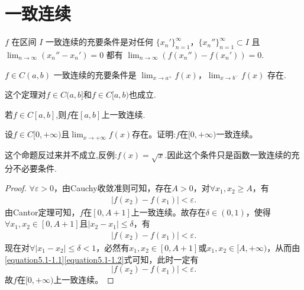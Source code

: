 \documentclass[../../main.tex]{subfiles}
\begin{document}
\section{一致连续}

\begin{theorem}\label{theorem:一致连续的充要条件1}
\(f\) 在区间 \(I\) 一致连续的充要条件是对任何 \(\{x_n'\}_{n = 1}^{\infty}\)，\(\{x_n''\}_{n = 1}^{\infty}\subset I\) 且 \(\lim_{n\rightarrow\infty}(x_n'' - x_n') = 0\) 都有 \(\lim_{n\rightarrow\infty}(f(x_n'') - f(x_n'))=0\).
\end{theorem}

\begin{theorem}[Cantor定理]\label{theorem:Cantor定理}
\(f\in C(a,b)\) 一致连续的充要条件是 \(\lim_{x\rightarrow a^{+}}f(x)\)，\(\lim_{x\rightarrow b^{-}}f(x)\) 存在.
\end{theorem}
\begin{remark}
这个定理对$f\in C(a,b]$和$f\in C[a,b)$也成立.
\end{remark}

\begin{corollary}\label{corollary:闭区间上的连续函数一定一致连续.}
若$f\in C[a,b]$,则$f$在$[a,b]$上一致连续.
\end{corollary}

\begin{proposition}\label{proposition一致连续的充分不必要条件}
设\(f\in C[0,+\infty)\)且\(\lim_{x\rightarrow +\infty}f(x)\)存在。证明:\(f\)在\([0,+\infty)\)一致连续。
\end{proposition}
\begin{remark}
这个命题反过来并不成立,反例:$f(x)=\sqrt{x}$.因此这个条件只是函数一致连续的充分不必要条件.
\end{remark}
\begin{proof}
\(\forall \varepsilon > 0\)，由Cauchy收敛准则可知，存在\(A > 0\)，对\(\forall x_1, x_2 \geqslant A\)，有
\begin{align}
\left| f(x_2) - f(x_1) \right| < \varepsilon.  \label{equation5.1-1.1}
\end{align}
由Cantor定理可知，\(f\)在\([0, A + 1]\)上一致连续。故存在\(\delta \in (0, 1)\)，使得\(\forall x_1, x_2 \in [0, A + 1]\)且\(\left| x_2 - x_1 \right| \leqslant \delta\)，有
\begin{align}
\left| f(x_2) - f(x_1) \right| < \varepsilon.\label{equation5.1-1.2}
\end{align}
现在对\(\forall \left| x_1 - x_2 \right| \leqslant \delta < 1\)，必然有\(x_1, x_2 \in [0, A + 1]\)或\(x_1, x_2 \in [A, +\infty)\)，从而由\eqref{equation5.1-1.1}\eqref{equation5.1-1.2}式可知，此时一定有
\[
\left| f(x_2) - f(x_1) \right| < \varepsilon.
\]
故\(f\)在\([0, +\infty)\)上一致连续。
\end{proof}
\end{document}
